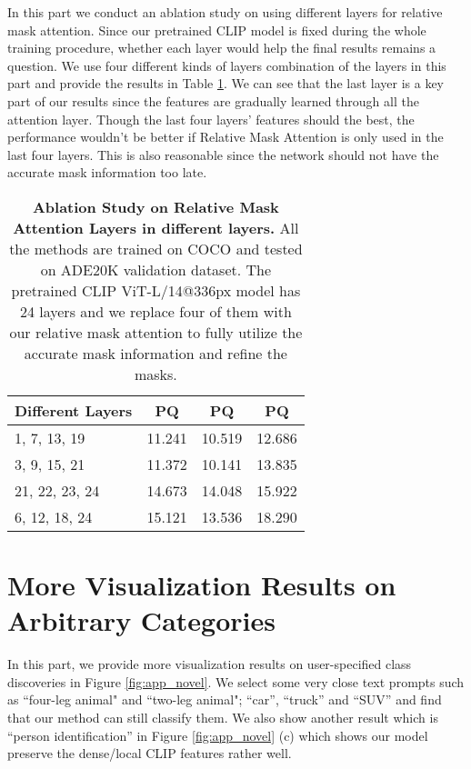 \documentclass{article}
\theoremstyle{plain}
\theoremstyle{definition}
\theoremstyle{remark}
\begin{document}
In this part we conduct an ablation study on using different layers for relative mask attention. Since our pretrained CLIP model is fixed during the whole training procedure, whether each layer would help the final results remains a question. We use four different kinds of layers combination of the layers in this part and provide the results in Table \ref{tab:ablation_rma}. We can see that the last layer is a key part of our results since the features are gradually learned through all the attention layer. Though the last four layers' features should the best, the performance wouldn't be better if Relative Mask Attention is only used in the last four layers. This is also reasonable since the network should not have the accurate mask information too late.

\begin{table}[!htbp]
\begin{center}
\caption{\textbf{Ablation Study on Relative Mask Attention Layers in different layers.} All the methods are trained on COCO and tested on ADE20K validation dataset. The pretrained CLIP ViT-L/14@336px model has 24 layers and we replace four of them with our relative mask attention to fully utilize the accurate mask information and refine the masks. }

\label{tab:ablation_rma}
\begin{tabular}{l | c | c | c}
 Different Layers & PQ & PQ & PQ\\
\hline
1, 7, 13, 19 & 11.241 & 10.519  & 12.686 \\
3, 9, 15, 21 & 11.372 & 10.141 & 13.835 \\
21, 22, 23, 24 & 14.673 & 14.048 & 15.922 \\
6, 12, 18, 24 & 15.121 & 13.536 & 18.290
\end{tabular}
\end{center}
\end{table}

\section{More Visualization Results on Arbitrary Categories}

In this part, we provide more visualization results on user-specified class discoveries in Figure \ref{fig:app_novel}. We select some very close text prompts such as ``four-leg animal" and ``two-leg animal"; ``car'', ``truck'' and ``SUV'' and find that our method can still classify them. We also show another result which is ``person identification'' in Figure \ref{fig:app_novel} (c) which shows our model preserve the dense/local CLIP features rather well.
\end{document}
